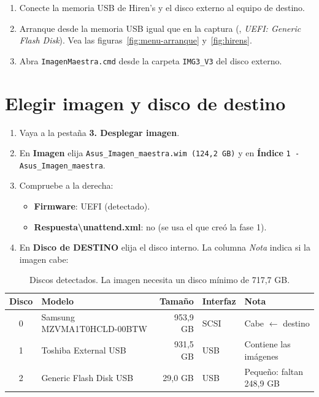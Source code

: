 \documentclass[11pt,a4paper]{report}
\newcommand{\bs}{\textbackslash\allowbreak{}}
\newcommand{\boton}[1]{\textsf{\textbf{#1}}}
\newcommand{\tecla}[1]{\tcbox[on line,boxsep=1pt,left=3pt,right=3pt,top=0pt,bottom=0pt,
  colback=grisclaro,colframe=gray!60,boxrule=0.4pt,arc=2pt]{\texttt{\small #1}}}
\begin{document}
\begin{enumerate}
  \item Conecte la memoria USB de Hiren's y el disco externo al equipo de
        destino.
  \item Arranque desde la memoria USB igual que en la captura (\tecla{F8},
        \emph{UEFI: Generic Flash Disk}). Vea las figuras~\ref{fig:menu-arranque}
        y~\ref{fig:hirens}.
  \item Abra \texttt{ImagenMaestra.cmd} desde la carpeta \texttt{IMG3\_V3} del
        disco externo.
\end{enumerate}

\section{Elegir imagen y disco de destino}\label{sec:elegir-disco}

\begin{enumerate}
  \item Vaya a la pestaña \boton{3. Desplegar imagen}.
  \item En \textbf{Imagen} elija \texttt{Asus\_Imagen\_maestra.wim (124,2 GB)}
        y en \textbf{Índice} \texttt{1 - Asus\_Imagen\_maestra}.
  \item Compruebe a la derecha:
    \begin{itemize}
      \item \textbf{Firmware}: UEFI (detectado).
      \item \textbf{Respuesta\bs unattend.xml}: no (se usa el que creó la fase 1).
    \end{itemize}
  \item En \textbf{Disco de DESTINO} elija el disco interno. La columna
        \emph{Nota} indica si la imagen cabe:
\end{enumerate}

\begin{table}[H]
  \centering
  \small
  \begin{tabularx}{\textwidth}{@{}c l r l X@{}}
    \toprule
    \textbf{Disco} & \textbf{Modelo} & \textbf{Tamaño} & \textbf{Interfaz} & \textbf{Nota} \\
    \midrule
    0 & Samsung MZVMA1T0HCLD-00BTW & 953,9 GB & SCSI & \textcolor{verdeok}{Cabe} $\leftarrow$ destino \\
    1 & Toshiba External USB & 931,5 GB & USB & Contiene las imágenes \\
    2 & Generic Flash Disk USB & 29,0 GB & USB & Pequeño: faltan 248,9 GB \\
    \bottomrule
  \end{tabularx}
  \caption{Discos detectados. La imagen necesita un disco mínimo de 717,7 GB.}
\end{table}
\end{document}
